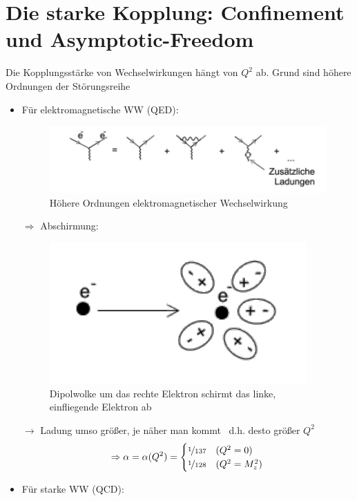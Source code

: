 \section{Die starke Kopplung: Confinement und Asymptotic-Freedom}
Die Kopplungsstärke von Wechselwirkungen hängt von $Q^2$ ab. Grund sind höhere Ordnungen der Störungsreihe
\begin{itemize}
\item Für elektromagnetische WW (QED):
\begin{figure}[!ht]
\centering
\includegraphics[width=.65\textwidth]{imgs/ep5-fig-7-10.pdf}
\caption{Höhere Ordnungen elektromagnetischer Wechselwirkung \label{fig:7.10}}
\end{figure}

$\Rightarrow$ Abschirmung:

\begin{figure}[!ht]
\centering
\includegraphics[width=.5\textwidth]{imgs/ep5-fig-7-11.pdf}
\caption{Dipolwolke um das rechte Elektron schirmt das linke, einfliegende Elektron ab \label{fig:7.11}}
\end{figure}

$\rightarrow$ Ladung umso größer, je \grqq näher man kommt \grqq\, d.h. desto größer $Q^2$
\begin{align}
\Rightarrow\alpha=\alpha(Q^2)=
\begin{cases}
\nicefrac{1}{137} & (Q^2=0)\\
\nicefrac{1}{128} & (Q^2=M^2_z)
\end{cases}
\end{align}

\item Für starke WW (QCD):


\end{itemize}
